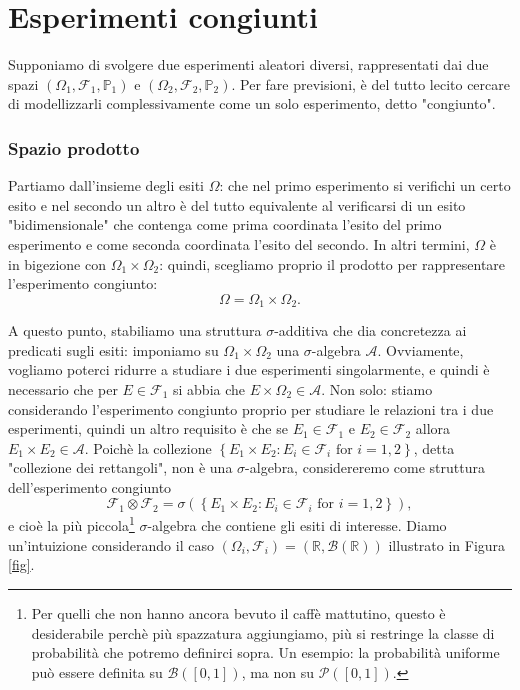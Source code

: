 
\chapter{Esperimenti congiunti}

Supponiamo di svolgere due esperimenti aleatori diversi, rappresentati dai due spazi $\left( \Omega_1, \mathcal{F}_1, \mathbb{P}_1 \right)$ e $\left( \Omega_2, \mathcal{F}_2, \mathbb{P}_2 \right)$. 
Per fare previsioni, è del tutto lecito cercare di modellizzarli complessivamente come un solo esperimento, detto "congiunto".

\subsection{Spazio prodotto}
Partiamo dall'insieme degli esiti $\Omega$: che nel primo esperimento si verifichi un certo esito e nel secondo un altro è del tutto equivalente al verificarsi di un esito "bidimensionale" che contenga come prima coordinata l'esito del primo esperimento e come seconda coordinata l'esito del secondo. 
In altri termini, $\Omega$ è in bigezione con $\Omega_1 \times \Omega_2$: quindi, scegliamo proprio il prodotto per rappresentare l'esperimento congiunto:
\[
	\Omega = \Omega_1 \times \Omega_2.	
\]

A questo punto, stabiliamo una struttura $\sigma$-additiva che dia concretezza ai predicati sugli esiti: imponiamo su $\Omega_1 \times \Omega_2$ una $\sigma$-algebra $\mathcal{A}$.
Ovviamente, vogliamo poterci ridurre a studiare i due esperimenti singolarmente, e quindi è necessario che per $E \in \mathcal{F}_1$ si abbia che $E \times \Omega_2 \in \mathcal{A}$. 
Non solo: stiamo considerando l'esperimento congiunto proprio per studiare le relazioni tra i due esperimenti, quindi un altro requisito è che se $E_1 \in \mathcal{F}_1$ e $E_2 \in \mathcal{F}_2$ allora $E_1 \times E_2 \in \mathcal{A}$. 
Poichè la collezione $\left\{ E_1 \times E_2 : E_i \in \mathcal{F}_i \text{ for } i=1,2 \right\}$, detta "collezione dei rettangoli", non è una $\sigma$-algebra, considereremo come struttura dell'esperimento congiunto
\[
	\mathcal{F}_1 \otimes \mathcal{F}_2 = \sigma \left( \left\{ E_1 \times E_2 : E_i \in \mathcal{F}_i \text{ for } i=1,2 \right\} \right),
\]
e cioè la più piccola\footnote{Per quelli che non hanno ancora bevuto il caffè mattutino, questo è desiderabile perchè più spazzatura aggiungiamo, più si restringe la classe di probabilità che potremo definirci sopra.
Un esempio: la probabilità uniforme può essere definita su $\mathcal{B}([0,1])$, ma non su $\mathcal{P}([0,1])$.} $\sigma$-algebra che contiene gli esiti di interesse. Diamo un'intuizione considerando il caso $\left( \Omega_i, \mathcal{F}_i \right) = \left( \mathbb{R}, \mathcal{B}(\mathbb{R}) \right)$ illustrato in Figura \ref{fig}. 


